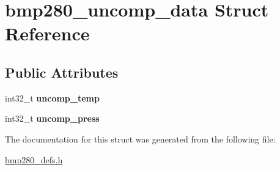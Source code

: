 \hypertarget{structbmp280__uncomp__data}{}\section{bmp280\+\_\+uncomp\+\_\+data Struct Reference}
\label{structbmp280__uncomp__data}
\subsection*{Public Attributes}
\begin{DoxyCompactItemize}
\item 
\mbox{\label{structbmp280__uncomp__data_a792c2ba2b3aebf2d6caf9462e0fbe870}} 
int32\+\_\+t {\bfseries uncomp\+\_\+temp}
\item 
\mbox{\label{structbmp280__uncomp__data_aecd77e3bc5ce7e58d578955a20cbef82}} 
int32\+\_\+t {\bfseries uncomp\+\_\+press}
\end{DoxyCompactItemize}


The documentation for this struct was generated from the following file\+:\begin{DoxyCompactItemize}
\item 
\mbox{\hyperlink{bmp280__defs_8h}{bmp280\+\_\+defs.\+h}}\end{DoxyCompactItemize}
